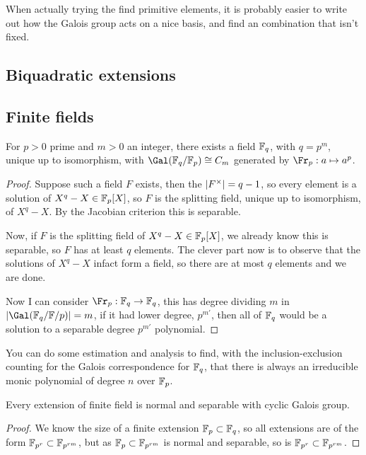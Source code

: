 \documentclass{article}
\begin{document}
When actually trying the find primitive elements, it is probably easier to write out how the Galois group acts on a nice basis, and find an combination that isn't fixed.

\subsection{Biquadratic extensions}

\subsection{Finite fields}

\begin{proposition}
    For $p>0$ prime and $m>0$ an integer, there exists a field $\mathbb{F}_q$, with $q=p^m$, unique up to isomorphism, with $\Gal(\bF_q/\bF_p)\cong C_m$ generated by $\Fr_p:a\mapsto a^p$.\begin{proof}
        Suppose such a field $F$ exists, then the $\left| F^\times \right|=q-1$, so every element is a solution of $X^q-X\in\mathbb{F}_p[X]$, so $F$ is the splitting field, unique up to isomorphism, of $X^q-X$. By the Jacobian criterion this is separable.

        Now, if $F$ is the splitting field of $X^q-X\in\mathbb{F}_p[X]$, we already know this is separable, so $F$ has at least $q$ elements. The clever part now is to observe that the solutions of $X^q-X$ infact form a field, so there are at most $q$ elements and we are done.

        Now I can consider $\Fr_p:\bF_q\rightarrow \bF_q$, this has degree dividing $m$ in $\abs{\Gal(\bF_q/\bF/p)}=m$, if it had lower degree, $p^{m'}$, then all of $\mathbb{F}_q$ would be a solution to a separable degree $p^{m'}$ polynomial.
    \end{proof}
\end{proposition}

You can do some estimation and analysis to find, with the inclusion-exclusion counting for the Galois correspondence for $\mathbb{F}_q$, that there is always an irreducible monic polynomial of degree $n$ over $\mathbb{F}_p$.

\begin{corollary}
    Every extension of finite field is normal and separable with cyclic Galois group.\begin{proof}
        We know the size of a finite extension $\mathbb{F}_p\subset \mathbb{F}_q$, so all extensions are of the form $\mathbb{F}_{p^r}\subset \mathbb{F}_{p^{rm}}$, but as $\mathbb{F}_p\subset \mathbb{F}_{p^{rm}}$ is normal and separable, so is $\mathbb{F}_{p^r}\subset \mathbb{F}_{p^{rm}}$.
    \end{proof}
\end{corollary}
\end{document}
